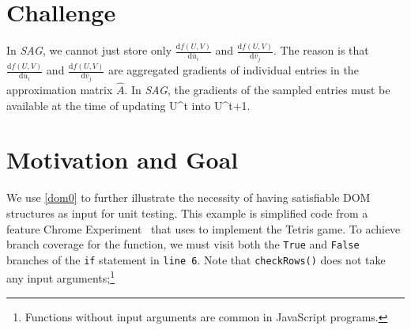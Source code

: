 \section{Challenge}
In \emph{SAG}, we cannot just store only $\frac{\text{d}f(U, V)}{\text{d}\bar{u}_i}$ and $\frac{\text{d}f(U, V)}{\text{d}\bar{v}_j}$.  
The reason is that $\frac{\text{d}f(U, V)}{\text{d}\bar{u}_i}$ and $\frac{\text{d}f(U, V)}{\text{d}\bar{v}_j}$ are aggregated gradients of individual entries in the approximation matrix $\hat{A}$.
In \emph{SAG}, the gradients of the sampled entries must be available at the time of updating U^{t} into U^{t+1}.  





\section{Motivation and Goal}
We use \autoref{dom0} to further illustrate the necessity of having satisfiable DOM structures as input for \js unit testing.
This example is simplified code from a feature Chrome Experiment~\cite{domtris} that uses \js to implement the Tetris game.
%
%
To achieve branch coverage for the  function, we must visit both the {\tt True} and {\tt False} branches of the {\tt if} statement in {\tt line 6}. 
Note that {\tt checkRows()} does not take any input arguments;\footnote{Functions without input arguments are common in JavaScript programs.} 
